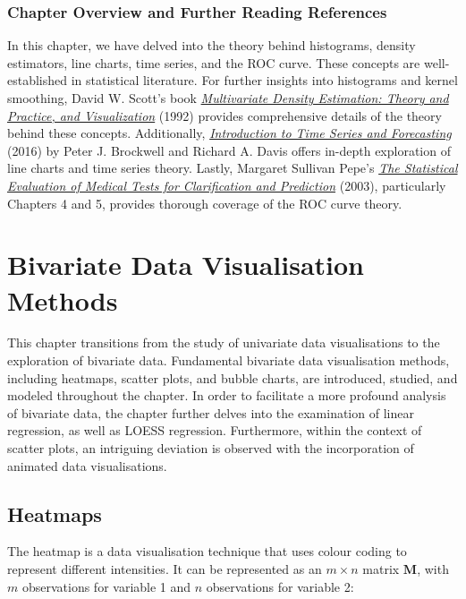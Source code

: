 \documentclass{article}\usepackage[]{graphicx}\usepackage[]{xcolor}
\numberwithin{equation}{section}
\begin{document}
\subsubsection*{Chapter Overview and Further Reading References}

\noindent In this chapter, we have delved into the theory behind histograms, density estimators, line charts, time series, and the ROC curve. These concepts are well-established in statistical literature. For further insights into histograms and kernel smoothing, David W. Scott's book \href{https://ebookcentral.proquest.com/lib/ed/detail.action?docID=1895499&pq-origsite=primo}{\textit{Multivariate Density Estimation: Theory and Practice, and Visualization}} (1992) provides comprehensive details of the theory behind these concepts. Additionally, \href{https://link-springer-com.eux.idm.oclc.org/book/10.1007/978-3-319-29854-2}{\textit{Introduction to Time Series and Forecasting}} (2016) by Peter J. Brockwell and Richard A. Davis offers in-depth exploration of line charts and time series theory. Lastly, Margaret Sullivan Pepe's \href{https://ebookcentral.proquest.com/lib/ed/detail.action?docID=1573145}{\textit{The Statistical Evaluation of Medical Tests for Clarification and Prediction}} (2003), particularly Chapters 4 and 5, provides thorough coverage of the ROC curve theory. 

\newpage

\section{Bivariate Data Visualisation Methods}

\noindent This chapter transitions from the study of univariate data visualisations to the exploration of bivariate data. Fundamental bivariate data visualisation methods, including heatmaps, scatter plots, and bubble charts, are introduced, studied, and modeled throughout the chapter. In order to facilitate a more profound analysis of bivariate data, the chapter further delves into the examination of linear regression, as well as LOESS regression. Furthermore, within the context of scatter plots, an intriguing deviation is observed with the incorporation of animated data visualisations.

\subsection{Heatmaps}
The heatmap is a data visualisation technique that uses colour coding to represent different intensities. It can be represented as an $m \times n$ matrix $\mathbf{M}$, with $m$ observations for variable 1 and $n$ observations for variable 2:
\end{document}
